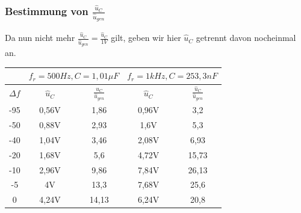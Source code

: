 \documentclass{article}
\begin{document}
\subsubsection{Bestimmung von $\frac{\hat{u}_C}{\hat{u}_{gen}}$}

Da nun nicht mehr $\frac{\hat{u}_C}{\hat{u}_{gen}} = \frac{\hat{u}_C}{1V}$ gilt, geben wir hier $\hat{u}_C$ getrennt davon nocheinmal an. 

\begin{table}[h]
  \begin{center}

    \begin{tabular}{|c|c|c|c|c|}
      \hline
                 & \multicolumn{2}{c|}{$f_r = 500Hz, C = 1,01\mu F$} & \multicolumn{2}{c|}{$f_r = 1kHz, C= 253,3 nF$}                                                   \\
      \hline
      $\Delta f$ & $\hat{u}_C$                                       & $\frac{\hat{u}_C}{\hat{u}_{gen}}$              & $\hat{u}_C$ & $\frac{\hat{u}_C}{\hat{u}_{gen}}$ \\
      \hline
      -95        & 0,56V                                             & 1,86                                           & 0,96V       & 3,2                               \\
      \hline
      -50        & 0,88V                                             & 2,93                                           & 1,6V        & 5,3                               \\
      \hline
      -40        & 1,04V                                             & 3,46                                           & 2,08V       & 6,93                              \\
      \hline
      -20        & 1,68V                                             & 5,6                                            & 4,72V       & 15,73                             \\
      \hline
      -10        & 2,96V                                             & 9,86                                           & 7,84V       & 26,13                             \\
      \hline
      -5         & 4V                                                & 13,3                                           & 7,68V       & 25,6                              \\
      \hline
      0          & 4,24V                                             & 14,13                                          & 6,24V       & 20,8                              \\

\end{tabular}
\end{center}
\end{table}
\end{document}
